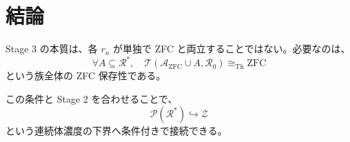 \documentclass[a4paper,11pt]{ltjsarticle}
\begin{document}
\section{結論}
Stage 3 の本質は、各 \(r_n\) が単独で ZFC と両立することではない。必要なのは、
\[
\boxed{
\forall A\subseteq\mathcal{R}^*,
\quad
\mathcal{T}(\mathcal{A}_{\mathrm{ZFC}}\cup A,\mathcal{R}_0)
\cong_{\mathrm{Th}}\mathrm{ZFC}
}
\]
という族全体の ZFC 保存性である。

この条件と Stage 2 を合わせることで、
\[
\mathcal{P}(\mathcal{R}^*)\hookrightarrow\mathcal{Z}
\]
という連続体濃度の下界へ条件付きで接続できる。
\end{document}
